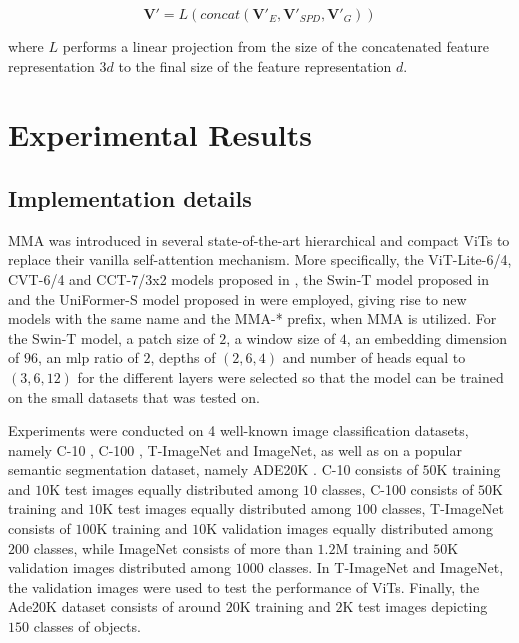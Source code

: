 \documentclass[10pt,twocolumn,letterpaper]{article}
\begin{document}
\begin{equation}
\label{eq:late_fusion}
    \textbf{V}' =  L(concat(\textbf{V}'_E, \textbf{V}'_{SPD}, \textbf{V}'_G))
\end{equation}

where $L$ performs a linear projection from the size of the concatenated feature representation $3d$ to the final size of the feature representation $d$.

\section{Experimental Results}
\label{sec:results}

\subsection{Implementation details}

MMA was introduced in several state-of-the-art hierarchical and compact ViTs to replace their vanilla self-attention mechanism. More specifically, the ViT-Lite-6/4, CVT-6/4 and CCT-7/3x2 models proposed in \cite{Author1}, the Swin-T model proposed in \cite{Author9} and the UniFormer-S model proposed in \cite{Author57} were employed, giving rise to new models with the same name and the MMA-* prefix, when MMA is utilized. For the Swin-T model, a patch size of $2$, a window size of $4$, an embedding dimension of $96$, an mlp ratio of $2$, depths of $(2,6,4)$ and number of heads equal to $(3,6,12)$ for the different layers were selected so that the model can be trained on the small datasets that was tested on. 

Experiments were conducted on 4 well-known image classification datasets, namely C-10 \cite{Author38}, C-100 \cite{Author38}, T-ImageNet \cite{Author40} and ImageNet, as well as on a popular semantic segmentation dataset, namely ADE20K \cite{Author59, Author60}. C-10 consists of $50$K training and $10$K test images equally distributed among $10$ classes, C-100 consists of $50$K training and $10$K test images equally distributed among $100$ classes, T-ImageNet consists of $100$K training and $10$K validation images equally distributed among $200$ classes, while ImageNet consists of more than $1.2$M training and $50$K validation images distributed among $1000$ classes. In T-ImageNet and ImageNet, the validation images were used to test the performance of ViTs. Finally, the Ade20K dataset consists of around $20$K training and $2$K test images depicting $150$ classes of objects.
\end{document}
